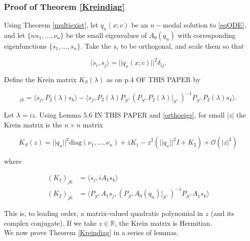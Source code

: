 \documentclass[12pt]{article}
\def\R{{\mathbb R}}
\begin{document}
\subsubsection{Proof of Theorem \ref{Kreindiag}}

Using Theorem \ref{multiexist}, let $q_n(x; c)$ be an $n-$modal solution to \eqref{eqODE}, and let $\{nu_1, \dots, \nu_n\}$ be the small eigenvalues of $A_0(q_n)$ with corresponding eigenfunctions $\{ s_1, \dots, s_n \}$. Take the $s_i$ to be orthogonal, and scale them so that

\begin{equation}\label{orthoeigs}
\langle s_i, s_j \rangle = ||q_x(x; c)||^2 \delta_{ij}.
\end{equation}

Define the Krein matrix $K_S(\lambda)$ as on p.4 OF THIS PAPER by 

\begin{equation}
[K_S(z)]_{jk} = 
\langle s_j , P_2(\lambda)s_k\rangle 
- \langle s_j , P_2(\lambda) P_{S^{\perp}} (P_{S^{\perp}} P_2(\lambda)|_{S^{\perp}} )^{-1} P_{S^{\perp}} P_2(\lambda) s_k \rangle.
\end{equation}

Let $\lambda = i z$. Using Lemma 5.6 IN THIS PAPER and \eqref{orthoeigs}, for small $|z|$ the Krein matrix is the $n \times n$ matrix

\begin{equation}\label{Kreinform}
K_S(z) = ||q_x||^2 \text{diag}(\nu_1, \dots, \nu_n) + \overline{z} K_1 
- \overline{z}^2 ( ||q_x||^2 I + K_2) + \mathcal{O}(|z|^3)
\end{equation}

where

\begin{align}
(K_1)_{jk} &= \langle s_j, i A_1 s_k \rangle \label{defK1} \\
(K_2)_{jk} &= \langle P_{S^\perp} A_1 s_j, (P_{S^\perp} A_0(q_n)|_{S^\perp})^{-1} P_{S^\perp} A_1 s_k \rangle \label{defK2}
\end{align}

This is, to leading order, a matrix-valued quadratic polynomial in $z$ (and its complex conjugate). If we take $z \in \R$, the Krein matrix is Hermitian.\\

We now prove Theorem \ref{Kreindiag} in a series of lemmas. 

\end{document}
